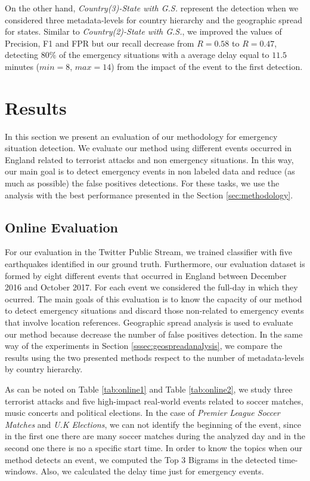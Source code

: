 \documentclass[sigconf]{acmart}
\begin{document}
On the other hand, \textit{Country(3)-State with G.S.} represent the detection when we considered three metadata-levels for country hierarchy and the geographic spread for states. Similar to  \textit{Country(2)-State with G.S.}, we improved the values of Precision, F1 and FPR but our recall decrease from $R = 0.58$ to $R = 0.47$, detecting  $80\%$ of the emergency situations with a average delay equal to $11.5$ minutes ($min=8$, $max=14$) from the impact of the event to the first detection.


\section{Results}

In this section we present an evaluation of our methodology for emergency situation detection. We evaluate our method using different events occurred in England related to terrorist attacks and non emergency situations. In this way, our main goal is to detect emergency events in non labeled data and reduce (as much as possible) the false positives detections. For these tasks, we use the analysis with the best performance presented in the Section \ref{sec:methodology}.


\subsection{Online Evaluation}
For our evaluation in the Twitter Public Stream, we trained classifier with five earthquakes identified in our ground truth. Furthermore, our evaluation dataset is formed by eight different events that occurred in England between December 2016 and October 2017. For each event we considered the full-day in which they ocurred. The main goals of this evaluation is to know the capacity of our method to detect emergency situations and discard those non-related to emergency events that involve location references. Geographic spread analysis is used to evaluate our method because decrease the number of false positives detection. In the same way of the experiments in Section \ref{sssec:geospreadanalysis}, we compare the results using the two presented methods respect to the number of metadata-levels by country hierarchy.

As can be noted on Table \ref{tab:online1} and Table \ref{tab:online2}, we study three terrorist attacks and five high-impact real-world events related to soccer matches, music concerts and political elections. In the case of \textit{Premier League Soccer Matches} and \textit{U.K Elections}, we can not identify the beginning of the event, since in the first one there are many soccer matches during the analyzed day and in the second one there is no a specific start time. In order to know the topics when our method detects an event, we computed the Top 3 Bigrams in the detected time-windows. Also, we calculated the delay time just for emergency events.
\end{document}
